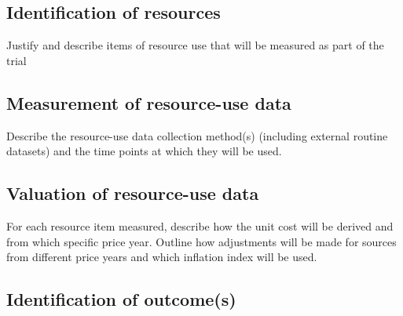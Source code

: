 \subsection{Identification of resources}

Justify and describe items of resource use that will be measured as
part of the trial



\subsection{Measurement of resource-use data}

Describe the resource-use data collection method(s) (including
external routine datasets) and the time points at which they will be
used.


\subsection{Valuation of resource-use data}

For each resource item measured, describe how the unit cost will be
derived and from which specific price year. Outline how adjustments
will be made for sources from different price years and which
inflation index will be used.


\subsection{Identification of outcome(s)}

